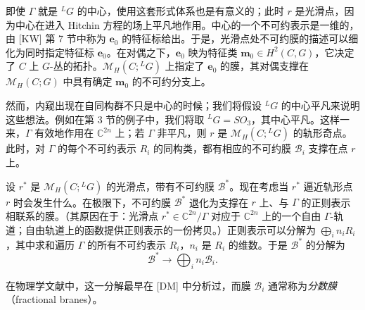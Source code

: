 即使 $\Gamma$ 就是 ${}^{L}G$ 的中心，使用这套形式体系也是有意义的；此时 $r$ 是光滑点，因为中心在进入 Hitchin 方程的场上平凡地作用。中心的一个不可约表示是一维的，由 [KW] 第 7 节中称为 $\boldsymbol{e}_0$ 的特征标给出。于是，光滑点处不可约膜的描述可以细化为同时指定特征标 $\boldsymbol{e}_0$。在对偶之下，$\boldsymbol{e}_0$ 映为特征类 $\boldsymbol{m}_0\in H^2(C,G)$，它决定了 $C$ 上 $G$-丛的拓扑。$\mathcal{M}_H(C;{}^{L}G)$ 上指定了 $\boldsymbol{e}_0$ 的膜，其对偶支撑在 $\mathcal{M}_H(C;G)$ 中具有确定 $\boldsymbol{m}_0$ 的不可约分支上。

然而，内窥出现在自同构群不只是中心的时候；我们将假设 ${}^{L}G$ 的中心平凡来说明这些想法。例如在第 3 节的例子中，我们将取 ${}^{L}G=SO_3$，其中心平凡。这样一来，$\Gamma$ 有效地作用在 $\mathbb{C}^{2n}$ 上；若 $\Gamma$ 非平凡，则 $r$ 是 $\mathcal{M}_H(C;{}^{L}G)$ 的轨形奇点。此时，对 $\Gamma$ 的每个不可约表示 $R_i$ 的同构类，都有相应的不可约膜 $\mathcal{B}_i$ 支撑在点 $r$ 上。

设 $r^*$ 是 $\mathcal{M}_H(C;{}^{L}G)$ 的光滑点，带有不可约膜 $\mathcal{B}^*$。现在考虑当 $r^*$ 逼近轨形点 $r$ 时会发生什么。在极限下，不可约膜 $\mathcal{B}^*$ 退化为支撑在 $r$ 上、与 $\Gamma$ 的正则表示相联系的膜。（其原因在于：光滑点 $r^*\in\mathbb{C}^{2n}/\Gamma$ 对应于 $\mathbb{C}^{2n}$ 上的一个自由 $\Gamma$-轨道；自由轨道上的函数提供正则表示的一份拷贝。）正则表示可以分解为 $\bigoplus_i n_iR_i$，其中求和遍历 $\Gamma$ 的所有不可约表示 $R_i$，$n_i$ 是 $R_i$ 的维数。于是 $\mathcal{B}^*$ 的分解为
\begin{equation}\tag{2.3}
\mathcal{B}^*\to\bigoplus_i n_i\mathcal{B}_i.
\end{equation}


在物理学文献中，这一分解最早在 [DM] 中分析过，而膜 $\mathcal{B}_i$ 通常称为\emph{分数膜}（fractional branes）。

